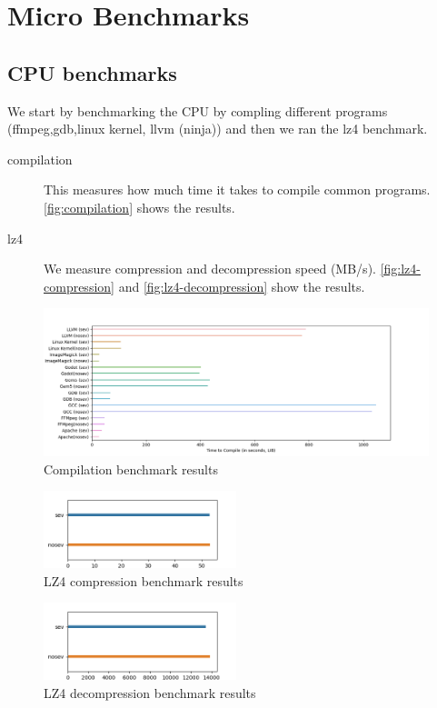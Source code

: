 \documentclass[letterpaper,twocolumn,10pt]{article}
\begin{document}
\section{Micro Benchmarks}

\subsection {CPU benchmarks}
We start by benchmarking the CPU by compling different programs (ffmpeg,gdb,linux kernel, llvm (ninja)) and then we ran the lz4 benchmark.

\begin{description}
    \item[compilation~\cite{compilation}] This measures how much time it takes to compile common programs. \autoref{fig:compilation} shows the results.
    \item[lz4~\cite{lz4}] We measure compression and decompression speed (MB/s). \autoref{fig:lz4-compression} and \autoref{fig:lz4-decompression}  show the results.
\end{description}


\begin{figure}[t]
    \centering
    \includegraphics[width=1.0\textwidth]{../compilation.png}
    \caption{Compilation benchmark results}
    \label{fig:compilation}
\end{figure}

\begin{figure}[t]
    \centering
    \includegraphics[width=0.5\textwidth]{../lz4-compression.png}
    \caption{LZ4 compression benchmark results}
    \label{fig:lz4-compression}
\end{figure}

\begin{figure}[t]
    \centering
    \includegraphics[width=0.5\textwidth]{../lz4-decompression.png}
    \caption{LZ4 decompression benchmark results}
    \label{fig:lz4-decompression}
\end{figure}
\end{document}
